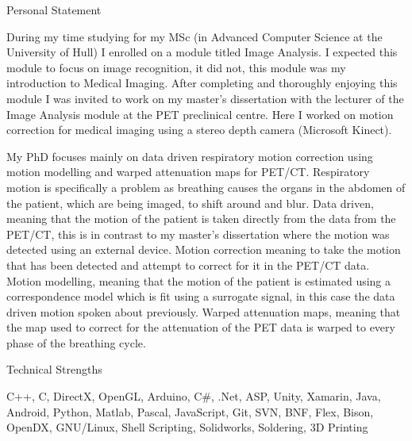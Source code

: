 \documentclass{cv}
\begin{document}

\begin{rSection}{Personal Statement}

\item During my time studying for my MSc (in Advanced Computer Science at the University of Hull) I enrolled on a module titled Image Analysis. I expected this module to focus on image recognition, it did not, this module was my introduction to Medical Imaging. After completing and thoroughly enjoying this module I was invited to work on my master’s dissertation with the lecturer of the Image Analysis module at the PET preclinical centre. Here I worked on motion correction for medical imaging using a stereo depth camera (Microsoft Kinect).

\item My PhD focuses mainly on data driven respiratory motion correction using motion modelling and warped attenuation maps for PET/CT. Respiratory motion is specifically a problem as breathing causes the organs in the abdomen of the patient, which are being imaged, to shift around and blur. Data driven, meaning that the motion of the patient is taken directly from the data from the PET/CT, this is in contrast to my master’s dissertation where the motion was detected using an external device. Motion correction meaning to take the motion that has been detected and attempt to correct for it in the PET/CT data. Motion modelling, meaning that the motion of the patient is estimated using a correspondence model which is fit using a surrogate signal, in this case the data driven motion spoken about previously. Warped attenuation maps, meaning that the map used to correct for the attenuation of the PET data is warped to every phase of the breathing cycle.


\end{rSection}


\begin{rSection}{Technical Strengths}

\item C++, C, DirectX, OpenGL, Arduino, C\#, .Net, ASP, Unity, Xamarin, Java, Android, Python, Matlab, Pascal, JavaScript, Git, SVN, BNF,  Flex, Bison, OpenDX, GNU/Linux, Shell Scripting, Solidworks, Soldering, 3D Printing

\end{rSection}
\end{document}
